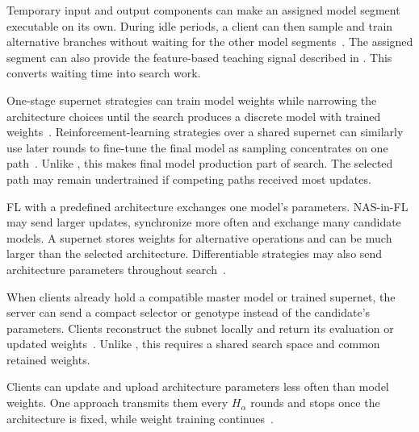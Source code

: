  Temporary input and output components can make an assigned model segment executable on its own. During idle periods, a client can then sample and train alternative branches without waiting for the other model segments~\cite{nasfly_2024}. The assigned segment can also provide the feature-based teaching signal described in . This converts waiting time into search work.

 One-stage supernet strategies can train model weights while narrowing the architecture choices until the search produces a discrete model with trained weights~\cite{dfnas_2020,fed_meta_nas_2025}. Reinforcement-learning strategies over a shared supernet can similarly use later rounds to fine-tune the final model as sampling concentrates on one path~\cite{perfedrlnas_2024}. Unlike , this makes final model production part of search. The selected path may remain undertrained if competing paths received most updates.


FL with a predefined architecture exchanges one model's parameters. NAS-in-FL may send larger updates, synchronize more often and exchange many candidate models. A supernet stores weights for alternative operations and can be much larger than the selected architecture. Differentiable strategies may also send architecture parameters throughout search~\cite{fedoras_2022,hapfnas_2025,fednas_2021,fedregnas_2025}.

 When clients already hold a compatible master model or trained supernet, the server can send a compact selector or genotype instead of the candidate's parameters. Clients reconstruct the subnet locally and return its evaluation or updated weights~\cite{rt_fed_evo_nas_2020,medical_image_segmentation_fednas_2024,intrusion_detection_fednas_2024}. Unlike , this requires a shared search space and common retained weights.

 Clients can update and upload architecture parameters less often than model weights. One approach transmits them every \(H_{\alpha}\) rounds and stops once the architecture is fixed, while weight training continues~\cite{fedregnas_2025}.

